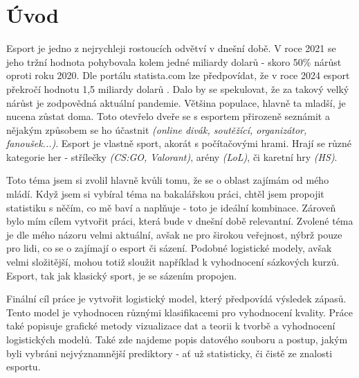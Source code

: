 \chapter*{Úvod}
Esport je jedno z nejrychleji rostoucích odvětví v dnešní době. V roce 2021 se jeho tržní hodnota pohybovala kolem jedné miliardy dolarů - skoro
50\% nárůst oproti roku 2020. Dle portálu statista.com lze předpovídat, že v roce 2024 esport překročí hodnotu 1,5 miliardy dolarů \cite{Gough2021}.
Dalo by se spekulovat, že za takový velký nárůst je zodpovědná aktuální pandemie. Většina populace, hlavně ta mladší, je nucena zůstat doma. Toto otevřelo dveře
se s esportem přirozeně seznámit a nějakým způsobem se ho účastnit \textit{(online divák, soutěžící, organizátor, fanoušek...)}. Esport je vlastně sport,
akorát s počítačovými hrami. Hrají se různé kategorie her - střílečky \textit{(\ac{CS:GO}, Valorant)}, arény \textit{(\ac{LoL})}, či karetní hry
\textit{(\ac{HS})}.

Toto téma jsem si zvolil hlavně kvůli tomu, že se o oblast zajímám od mého mládí. Když jsem si vybíral téma na bakalářskou práci,
chtěl jsem propojit statistiku s něčím, co mě baví a naplňuje - toto je ideální kombinace. Zároveň bylo mím cílem vytvořit práci, která bude v dnešní době relevantní.
Zvolené téma je dle mého názoru velmi aktuální, avšak ne pro širokou veřejnost, nýbrž pouze pro lidi, co se o zajímají o esport či sázení.
Podobné logistické modely, avšak velmi složitější, mohou totiž sloužit například k vyhodnocení sázkových kurzů. Esport, tak jak klasický sport, je se sázením propojen. 

Finální cíl práce je vytvořit logistický model, který předpovídá výsledek zápasů. Tento model je vyhodnocen různými klasifikacemi pro vyhodnocení kvality.
Práce také popisuje grafické metody vizualizace dat a teorii k tvorbě a vyhodnocení logistických modelů. Také zde najdeme popis datového souboru a postup,
jakým byli vybráni nejvýznamnější prediktory - ať už statisticky, či čistě ze znalosti esportu. 
